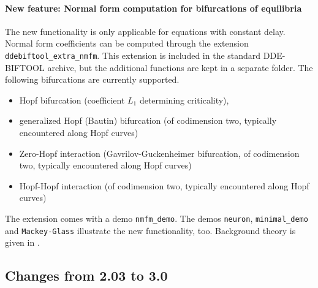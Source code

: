 \documentclass[10pt]{scrartcl}
\newcommand{\DDEBIFCODE}{\textsc{DDE-BIFTOOL}}
\begin{document}
\paragraph{New feature: Normal form computation for bifurcations of
  equilibria}
The new functionality is only applicable for equations with constant
delay. Normal form coefficients can be computed through the extension
\texttt{ddebiftool\_extra\_nmfm}. This extension is included in the
standard \DDEBIFCODE{} archive, but the additional functions are kept
in a separate folder. The following bifurcations are currently
supported.
\begin{itemize}
\item Hopf bifurcation (coefficient $L_1$ determining criticality),
\item generalized Hopf (Bautin) bifurcation (of codimension two,
  typically encountered along Hopf curves)
\item Zero-Hopf interaction (Gavrilov-Guckenheimer bifurcation, of codimension two,
  typically encountered along Hopf curves)
\item Hopf-Hopf interaction (of codimension two, typically encountered
  along Hopf curves) 
\end{itemize}
The extension comes with a demo \texttt{nmfm\_demo}. The demos
\texttt{neuron}, \texttt{minimal\_demo} and \texttt{Mackey-Glass}
illustrate the new functionality, too. Background theory is given in \cite{W14}.
\subsection{Changes from 2.03 to 3.0}
\label{sec:v2to3}
\end{document}

